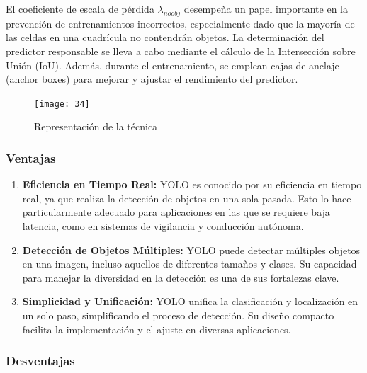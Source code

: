 	El coeficiente de escala de pérdida $\lambda_{noobj}$ desempeña un papel importante en la prevención de entrenamientos incorrectos, especialmente dado que la mayoría de las celdas en una cuadrícula no contendrán objetos. La determinación del predictor responsable se lleva a cabo mediante el cálculo de la Intersección sobre Unión (IoU). Además, durante el entrenamiento, se emplean cajas de anclaje (anchor boxes) para mejorar y ajustar el rendimiento del predictor.

	\begin{figure}[ht]
		\centering
		\texttt{[image: 34]}
		\caption{Representación de la técnica}
	\end{figure}
	
	\subsubsection{Ventajas}
	
	\begin{enumerate}
		\item \textbf{Eficiencia en Tiempo Real:} YOLO es conocido por su eficiencia en tiempo real, ya que realiza la detección de objetos en una sola pasada. Esto lo hace particularmente adecuado para aplicaciones en las que se requiere baja latencia, como en sistemas de vigilancia y conducción autónoma.
    
    	\item \textbf{Detección de Objetos Múltiples:} YOLO puede detectar múltiples objetos en una imagen, incluso aquellos de diferentes tamaños y clases. Su capacidad para manejar la diversidad en la detección es una de sus fortalezas clave.
    
   		\item \textbf{Sim­plicidad y Unificación:} YOLO unifica la clasificación y localización en un solo paso, simplificando el proceso de detección. Su diseño compacto facilita la implementación y el ajuste en diversas aplicaciones.
    
	\end{enumerate}
	
	\subsubsection{Desventajas}
	

